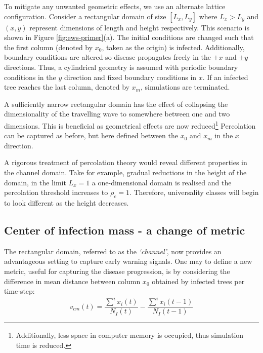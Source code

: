 To mitigate any unwanted geometric effects, %
we use an alternate lattice configuration. %
Consider a rectangular domain of size $[L_x, L_y]$ where $L_x>L_y$ and $(x, y)$ represent dimensions %
of length and height respectively. This scenario is shown in Figure \ref{fig:ews-primer}(a). %
The initial conditions are changed such that the first column (denoted by $x_0$, taken as the origin) is infected. %
Additionally, boundary conditions are altered so disease propagates freely in the $+x$ and $\pm y$ directions. %
Thus, a cylindrical geometry is assumed with periodic boundary conditions in the $y$ direction and fixed boundary conditions in $x$. %
If an infected tree reaches the last column, denoted by $x_m$, simulations are terminated. %

A sufficiently narrow rectangular domain has the effect of collapsing the dimensionality of the travelling wave to somewhere between one and two dimensions. %
This is beneficial as geometrical effects are now reduced\footnote{Additionally, less space in computer memory is occupied, thus simulation time is reduced.} %
Percolation can be captured as before, but here defined between the $x_0$ and $x_m$ in the $x$ direction. %

A rigorous treatment of percolation theory would reveal different properties in the channel domain. %
Take for example, gradual reductions in the height of the domain, in the limit $L_x = 1$ a one-dimensional domain is realised and the percolation threshold increases to $\rho_c=1$. %
Therefore, universality classes will begin to look different as the height decreases. %


\subsection{Center of infection mass - a change of metric}

The rectangular domain, referred to as the \textit{`channel'}, now provides an advantageous setting to capture early warning signals. %
One may to define a new metric, useful for capturing the disease progression, is by considering the difference in mean distance between column $x_0$ obtained by infected trees per time-step:
\begin{equation}
   v_{cm}(t) = \frac{\sum^i x_i(t)}{N_I(t)} - \frac{\sum^i x_i(t-1)}{N_I(t-1)}
   \label{eq:COM}
\end{equation}

